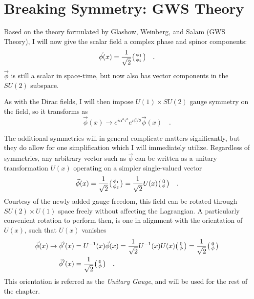 \section{Breaking Symmetry: GWS Theory}

    Based on the theory formulated by Glashow, Weinberg, and Salam (GWS Theory),
        I will now give the scalar field a complex phase and spinor components:
    \begin{equation}
        \vec{\phi}(x) = \frac{1}{\sqrt{2}} \big(\begin{smallmatrix} \phi_1 \\ \phi_2 \end{smallmatrix}\big)
        \quad.
    \end{equation}
    $\vec{\phi}$ is still a scalar in space-time, but now also has vector components in the $SU(2)$ subspace.

    As with the Dirac fields, I will then impose $U(1) \times SU(2)$ gauge symmetry on the field, so it transforms as
    \begin{equation}
        \vec{\phi}(x) \rightarrow e^{i \alpha^a \tau^a} e^{i \beta/2 } \vec{\phi}(x)
        \quad.
    \end{equation}

    The additional symmetries will in general complicate matters significantly,
        but they do allow for one simplification which I will immediately utilize.
    Regardless of symmetries, any arbitrary vector such as $\vec{\phi}$ can be written as a unitary transformation $U(x)$ operating on a simpler single-valued vector
    \begin{equation}
        \vec{\phi}(x) = \frac{1}{\sqrt{2}} \big(\begin{smallmatrix} \phi_1 \\ \phi_2 \end{smallmatrix}\big) = \frac{1}{\sqrt{2}} U(x) \big(\begin{smallmatrix} 0 \\ \phi \end{smallmatrix}\big)
        \quad.
    \end{equation}
    Courtesy of the newly added gauge freedom, this field can be rotated through $SU(2) \times U(1)$ space freely without affecting the Lagrangian.
    A particularly convenient rotation to perform then, is one in alignment with the orientation of $U(x)$, such that $U(x)$ vanishes
    \begin{equation} \begin{split}
        \vec{\phi}(x) \rightarrow \vec{\phi}'(x) 
            &= U^{-1}(x) \vec{\phi}(x)
            = \frac{1}{\sqrt{2}} U^{-1}(x) U(x) \big(\begin{smallmatrix} 0 \\ \phi \end{smallmatrix}\big)
            = \frac{1}{\sqrt{2}} \big(\begin{smallmatrix} 0 \\ \phi \end{smallmatrix}\big) \\
        \vec{\phi}'(x) &= \frac{1}{\sqrt{2}} \big(\begin{smallmatrix} 0 \\ \phi \end{smallmatrix}\big)
        \quad.
    \end{split} \end{equation}
    This orientation is referred as the \textit{Unitary Gauge}, and will be used for the rest of the chapter.

